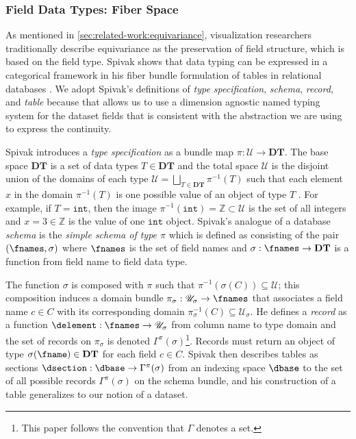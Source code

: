 \documentclass[journal]{IEEEtran}
\theoremstyle{definition}
\theoremstyle{remark}
\begin{document}
\subsubsection{\textcolor{fiber}{Field Data Types: Fiber Space \dfiber}}
\label{sec:atct:fb:fiber}
As mentioned in \autoref{sec:related-work:equivariance}, visualization researchers traditionally describe equivariance as the preservation of field structure, which is based on the field type. Spivak shows that data typing can be expressed in a categorical framework in his fiber bundle formulation of tables in relational databases \cite{spivakDatabasesAreCategories2010,spivakSimplicialDatabases2009}. We adopt Spivak's definitions of \textit{type specification}, \textit{schema}, \textit{record}, and \textit{table} because that allows us to use a dimension agnostic named typing system for the dataset fields that is consistent with the abstraction we are using to express the continuity.

Spivak introduces a \textit{type specification} as a bundle map $\pi: \mathscr{U} \rightarrow \textbf{DT}$. The base space $\textbf{DT}$ is a set of data types $T \in \textbf{DT}$ and the total space $\mathscr{U}$ is the disjoint union of the domains of each type $\mathscr{U} = \bigsqcup_{T \in \textbf{DT}} \pi^{-1}(T)$ such that each element $x$ in the domain $\pi^{-1}(T)$ is one possible value of an object of type $T$ \cite{spivakSimplicialDatabases2009}. For example, if $T=\texttt{int}$, then the image $\pi^{-1}(\texttt{int}) = \mathbb{Z} \subset \mathscr{U}$ is the set of all integers and $x=3 \in \mathbb{Z}$ is the value of one $\texttt{int}$ object. Spivak's analogue of a database \textit{schema}\cite{ullmanFirstCourseDatabase2008} is the \textit{simple schema of type $\pi$} which is defined as consisting of the pair $(\fnames, \sigma)$ where $\fnames$ is the set of field names and $\sigma: \fnames \rightarrow \textbf{DT}$ is a function from field name to field data type\cite{spivakSimplicialDatabases2009}.

The function $\sigma$ is composed with $\pi$ such that $\pi^{-1}(\sigma(C)) \subseteq \mathscr{U}$; this composition induces a domain bundle $\pi_{\sigma}:\mathscr{U}_{\sigma} \rightarrow \fnames$ that associates a field name $c \in C$ with its corresponding domain $\pi^{-1}_{\sigma}(C) \subseteq \mathscr{U}_{\sigma}$. He defines a \textit{record} as a function $\delement: \fnames \rightarrow \mathscr{U}_{\sigma}$ from column name to type domain and the set of records on $\pi_{\sigma}$ is denoted $\Gamma^{\pi}(\sigma)$\footnote{This paper follows the convention that $\Gamma$ denotes a set.}. Records must return an object of type $\sigma(\fname) \in \textbf{DT}$ for each field $c \in C$. Spivak then describes tables as sections $\dsection: \dbase \rightarrow \Gamma^{\pi}(\sigma)$ from an indexing space $\dbase$ to the set of all possible records $\Gamma^{\pi}(\sigma)$ on the schema bundle, and his construction of a table generalizes to our notion of a dataset.
\end{document}
